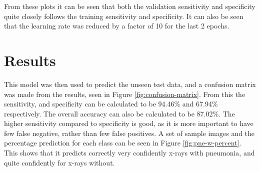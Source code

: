 \documentclass[12pt,a4paper,titlepage,twoside]{report}
\begin{document}
	\noindent{}
	
	From these plots it can be seen that both the validation sensitivity and specificity quite closely follows the training sensitivity and specificity. It can also be seen that the learning rate was reduced by a factor of 10 for the last 2 epochs.
	
\section{Results}
	This model was then used to predict the unseen test data, and a confusion matrix was made from the results, seen in Figure \ref{fig:confusion-matrix}. From this the sensitivity, and specificity can be calculated to be 94.46\% and 67.94\% respectively. The overall accuracy can also be calculated to be 87.02\%. The higher sensitivity compared to specificity is good, as it is more important to have few false negative, rather than few false positives. A set of sample images and the percentage prediction for each class can be seen in Figure \ref{fig:pne-w-percent}. This shows that it predicts correctly very confidently x-rays with pneumonia, and quite confidently for x-rays without.
	
\end{document}
